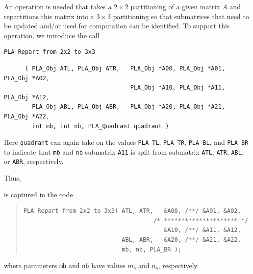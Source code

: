 An operation is needed that 
takes a $ 2 \times 2 $ partitioning of a given 
matrix $ A $ and repartitions this matrix into a 
$ 3 \times 3 $ partitioning so that submatrices 
that need to be updated and/or used for computation can be identified.
To support this operation, we introduce the call
\begin{FlaSpec}
\begin{verbatim}
PLA_Repart_from_2x2_to_3x3
\end{verbatim}
{\footnotesize
\begin{verbatim}
      ( PLA_Obj ATL, PLA_Obj ATR,   PLA_Obj *A00, PLA_Obj *A01, PLA_Obj *A02,
                                    PLA_Obj *A10, PLA_Obj *A11, PLA_Obj *A12,
        PLA_Obj ABL, PLA_Obj ABR,   PLA_Obj *A20, PLA_Obj *A21, PLA_Obj *A22,
        int mb, int nb, PLA_Quadrant quadrant )
\end{verbatim}
}
\end{FlaSpec}
Here {\tt quadrant} can again take on the
values {\tt PLA\_TL}, {\tt PLA\_TR},
{\tt PLA\_BL}, and {\tt PLA\_{BR}}
to indicate that {\tt mb} and {\tt nb}
submatrix {\tt A11} is split from 
submatrix {\tt ATL}, {\tt ATR},
{\tt ABL}, or {\tt ABR}, respectively.

Thus,
\renewcommand{\blocksize}{1}
\renewcommand{\repartitionings}{
$ \FlaTwoByTwo{ A_{TL} }{ A_{TR} }
            { A_{BL} }{ L_{BR} }
\rightarrow
\FlaThreeByThreeBR{ A_{00} }{ A_{01} }{ A_{02} }
                { A_{10} }{ A_{11} }{ A_{12} }
                { A_{20} }{ A_{21} }{ A_{22} }
$
}
\renewcommand{\repartitionsizes}{
$ A_{11} $ is $ m_b \times n_b $
}
\begin{quote}
\WSrepartition
\end{quote} 
is captured in the code
\begin{quote}
\footnotesize
\begin{verbatim}
PLA_Repart_from_2x2_to_3x3( ATL, ATR,   &A00, /**/ &A01, &A02,
                                     /* ********************* */
                                        &A10, /**/ &A11, &A12,
                            ABL, ABR,   &A20, /**/ &A21, &A22,
                            mb, nb, PLA_BR );
\end{verbatim}
\end{quote}
where parameters {\tt mb} and {\tt nb} have values $ m_b $ and $ n_b $,
respectively.

